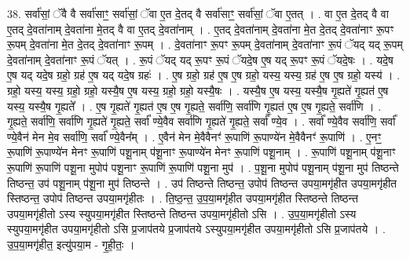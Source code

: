 \documentclass[17pt]{extarticle}
\begin{document}
38. सर्वा॑सां॒ ॅवै वै सर्वा॑साꣳ॒॒ सर्वा॑सां॒ ॅवा ए॒त दे॒तद् वै सर्वा॑साꣳ॒॒ सर्वा॑सां॒ ॅवा ए॒तत् । . वा ए॒त दे॒तद् वै वा ए॒तद् दे॒वता॑नाम् दे॒वता॑ना मे॒तद् वै वा ए॒तद् दे॒वता॑नाम् । . ए॒तद् दे॒वता॑नाम् दे॒वता॑ना मे॒त दे॒तद् दे॒वता॑नाꣳ रू॒पꣳ रू॒पम् दे॒वता॑ना मे॒त दे॒तद् दे॒वता॑नाꣳ रू॒पम् । . दे॒वता॑नाꣳ रू॒पꣳ रू॒पम् दे॒वता॑नाम् दे॒वता॑नाꣳ रू॒पं ॅयद् यद् रू॒पम् दे॒वता॑नाम् दे॒वता॑नाꣳ रू॒पं ॅयत् । . रू॒पं ॅयद् यद् रू॒पꣳ रू॒पं ॅयदे॒ष ए॒ष यद् रू॒पꣳ रू॒पं ॅयदे॒षः । . यदे॒ष ए॒ष यद् यदे॒ष ग्रहो॒ ग्रह॑ ए॒ष यद् यदे॒ष ग्रहः॑ । . ए॒ष ग्रहो॒ ग्रह॑ ए॒ष ए॒ष ग्रहो॒ यस्य॒ यस्य॒ ग्रह॑ ए॒ष ए॒ष ग्रहो॒ यस्य॑ । . ग्रहो॒ यस्य॒ यस्य॒ ग्रहो॒ ग्रहो॒ यस्यै॒ष ए॒ष यस्य॒ ग्रहो॒ ग्रहो॒ यस्यै॒षः । . यस्यै॒ष ए॒ष यस्य॒ यस्यै॒ष गृ॒ह्यते॑ गृ॒ह्यत॑ ए॒ष यस्य॒ यस्यै॒ष गृ॒ह्यते᳚ । . ए॒ष गृ॒ह्यते॑ गृ॒ह्यत॑ ए॒ष ए॒ष गृ॒ह्यते॒ सर्वा॑णि॒ सर्वा॑णि गृ॒ह्यत॑ ए॒ष ए॒ष गृ॒ह्यते॒ सर्वा॑णि । . गृ॒ह्यते॒ सर्वा॑णि॒ सर्वा॑णि गृ॒ह्यते॑ गृ॒ह्यते॒ सर्वा᳚ ण्ये॒वैव सर्वा॑णि गृ॒ह्यते॑ गृ॒ह्यते॒ सर्वा᳚ ण्ये॒व । . सर्वा᳚ ण्ये॒वैव सर्वा॑णि॒ सर्वा᳚ ण्ये॒वैन॑ मेन मे॒व सर्वा॑णि॒ सर्वा᳚ ण्ये॒वैन᳚म् । . ए॒वैन॑ मेन मे॒वैवैनꣳ॑ रू॒पाणि॑ रू॒पाण्ये॑न मे॒वैवैनꣳ॑ रू॒पाणि॑ । . ए॒नꣳ॒॒ रू॒पाणि॑ रू॒पाण्ये॑न मेनꣳ रू॒पाणि॑ पशू॒नाम् प॑शू॒नाꣳ रू॒पाण्ये॑न मेनꣳ रू॒पाणि॑ पशू॒नाम् । . रू॒पाणि॑ पशू॒नाम् प॑शू॒नाꣳ रू॒पाणि॑ रू॒पाणि॑ पशू॒ना मुपोप॑ पशू॒नाꣳ रू॒पाणि॑ रू॒पाणि॑ पशू॒ना मुप॑ । . प॒शू॒ना मुपोप॑ पशू॒नाम् प॑शू॒ना मुप॑ तिष्ठन्ते तिष्ठन्त॒ उप॑ पशू॒नाम् प॑शू॒ना मुप॑ तिष्ठन्ते । . उप॑ तिष्ठन्ते तिष्ठन्त॒ उपोप॑ तिष्ठन्त उपया॒मगृ॑हीत उपया॒मगृ॑हीत स्तिष्ठन्त॒ उपोप॑ तिष्ठन्त उपया॒मगृ॑हीतः । . ति॒ष्ठ॒न्त॒ उ॒प॒या॒मगृ॑हीत उपया॒मगृ॑हीत स्तिष्ठन्ते तिष्ठन्त उपया॒मगृ॑हीतो ऽस्य स्युपया॒मगृ॑हीत स्तिष्ठन्ते तिष्ठन्त उपया॒मगृ॑हीतो ऽसि । . उ॒प॒या॒मगृ॑हीतो ऽस्य स्युपया॒मगृ॑हीत उपया॒मगृ॑हीतो ऽसि प्र॒जाप॑तये प्र॒जाप॑तये ऽस्युपया॒मगृ॑हीत उपया॒मगृ॑हीतो ऽसि प्र॒जाप॑तये । . उ॒प॒या॒मगृ॑हीत॒ इत्यु॑पया॒म - गृ॒ही॒तः॒ । \newline
\pagebreak
{}
\end{document}
